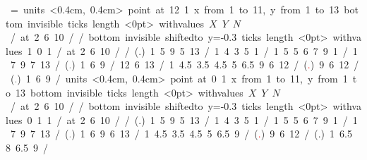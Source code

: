 \let\put\pictexput
\mbox{\beginpicture
\headingtoplotskip=\baselineskip
\setcoordinatesystem units <0.4cm, 0.4cm> point at 12 1
\setplotarea x from 1 to 11, y from 1 to 13
\axis bottom invisible ticks length <0pt>
  withvalues {$X$} {$Y$} {$N$} /  at 2 6 10 / /
\axis bottom invisible shiftedto y=-0.3 ticks length <0pt>
  withvalues {1} {0} {1} / at 2 6 10 / /
\setplotsymbol ({\normalsize .})
 1 5 9 5 13 /
 1 4 3 5 1 / 
 1 5 5 6 7 9 1 /
 1 7 9 7 13 /
\setplotsymbol ({\textcolor{gray}{\scriptsize .}})
 1  6 9 /
 12 6 13 / %
 1 4.5 3.5 4.5 5 6.5 9 6 12 / %
\setplotsymbol ({\textcolor{red}{\scriptsize .}})
 9  6 12 / %
\setplotsymbol ({\textcolor{gray}{\scriptsize .}})
 1 6 9 / %
\setcoordinatesystem units <0.4cm, 0.4cm> point at 0 1
\setplotarea x from 1 to 11, y from 1 to 13
\axis bottom invisible ticks length <0pt>
  withvalues {$X$} {$Y$} {$N$} /  at 2 6 10 / /
\axis bottom invisible shiftedto y=-0.3 ticks length <0pt>
  withvalues {0} {1} {1} / at 2 6 10 / /
\setplotsymbol ({\normalsize .})
 1 5 9 5 13 /
 1 4 3 5 1 / 
 1 5 5 6 7 9 1 /
 1 7 9 7 13 /
\setplotsymbol ({\textcolor{gray}{\scriptsize .}})
 1  6 9 6 13 /
 1 4.5 3.5 4.5 5 6.5 9 / %
\setplotsymbol ({\textcolor{red}{\scriptsize .}})
 9  6 12 / %
\setplotsymbol ({\scriptsize .})
 1 6.5 8 6.5 9 / %
\endpicture}
\let\put\latexput
